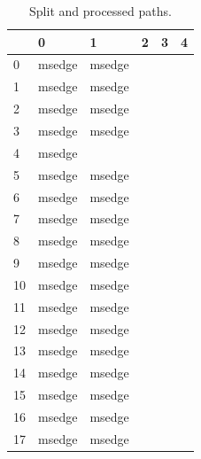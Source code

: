 \documentclass[a4paper,twoside,12pt]{book}
\begin{document}
\begin{appendices}
\begin{table}
	\centering
	\caption{Split and processed paths.}
	\label{id:tab:splitPaths}
	\begin{tabular}{l|l|l|l|l|l}
		\toprule
		{} &       0 &              1 &              2 &              3 &              4 \\
		\midrule
		0   &  msedge &         msedge &                &                &                \\
		1   &  msedge &         msedge &                &                &                \\
		2   &  msedge &         msedge &                &                &                \\
		3   &  msedge &         msedge &                &                &                \\
		4   &  msedge &                &                &                &                \\
		5   &  msedge &         msedge &                &                &                \\
		6   &  msedge &         msedge &                &                &                \\
		7   &  msedge &         msedge &                &                &                \\
		8   &  msedge &         msedge &                &                &                \\
		9   &  msedge &         msedge &                &                &                \\
		10  &  msedge &         msedge &                &                &                \\
		11  &  msedge &         msedge &                &                &                \\
		12  &  msedge &         msedge &                &                &                \\
		13  &  msedge &         msedge &                &                &                \\
		14  &  msedge &         msedge &                &                &                \\
		15  &  msedge &         msedge &                &                &                \\
		16  &  msedge &         msedge &                &                &                \\
		17  &  msedge &         msedge &                &                &                \\

\end{tabular}
\end{table}
\end{appendices}
\end{document}
